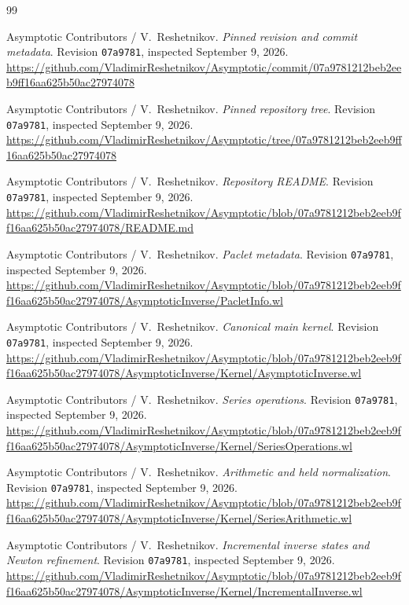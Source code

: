 \clearpage


\begin{thebibliography}{99}

\footnotesize

 Asymptotic Contributors / V.~Reshetnikov. \emph{Pinned revision and commit metadata}. Revision \texttt{07a9781}, inspected September 9, 2026. \url{https://github.com/VladimirReshetnikov/Asymptotic/commit/07a9781212beb2eeb9ff16aa625b50ac27974078}

 Asymptotic Contributors / V.~Reshetnikov. \emph{Pinned repository tree}. Revision \texttt{07a9781}, inspected September 9, 2026. \url{https://github.com/VladimirReshetnikov/Asymptotic/tree/07a9781212beb2eeb9ff16aa625b50ac27974078}

 Asymptotic Contributors / V.~Reshetnikov. \emph{Repository README}. Revision \texttt{07a9781}, inspected September 9, 2026. \url{https://github.com/VladimirReshetnikov/Asymptotic/blob/07a9781212beb2eeb9ff16aa625b50ac27974078/README.md}

 Asymptotic Contributors / V.~Reshetnikov. \emph{Paclet metadata}. Revision \texttt{07a9781}, inspected September 9, 2026. \url{https://github.com/VladimirReshetnikov/Asymptotic/blob/07a9781212beb2eeb9ff16aa625b50ac27974078/AsymptoticInverse/PacletInfo.wl}

 Asymptotic Contributors / V.~Reshetnikov. \emph{Canonical main kernel}. Revision \texttt{07a9781}, inspected September 9, 2026. \url{https://github.com/VladimirReshetnikov/Asymptotic/blob/07a9781212beb2eeb9ff16aa625b50ac27974078/AsymptoticInverse/Kernel/AsymptoticInverse.wl}

 Asymptotic Contributors / V.~Reshetnikov. \emph{Series operations}. Revision \texttt{07a9781}, inspected September 9, 2026. \url{https://github.com/VladimirReshetnikov/Asymptotic/blob/07a9781212beb2eeb9ff16aa625b50ac27974078/AsymptoticInverse/Kernel/SeriesOperations.wl}

 Asymptotic Contributors / V.~Reshetnikov. \emph{Arithmetic and held normalization}. Revision \texttt{07a9781}, inspected September 9, 2026. \url{https://github.com/VladimirReshetnikov/Asymptotic/blob/07a9781212beb2eeb9ff16aa625b50ac27974078/AsymptoticInverse/Kernel/SeriesArithmetic.wl}

 Asymptotic Contributors / V.~Reshetnikov. \emph{Incremental inverse states and Newton refinement}. Revision \texttt{07a9781}, inspected September 9, 2026. \url{https://github.com/VladimirReshetnikov/Asymptotic/blob/07a9781212beb2eeb9ff16aa625b50ac27974078/AsymptoticInverse/Kernel/IncrementalInverse.wl}


\end{thebibliography}
